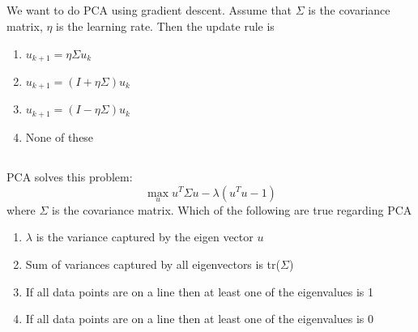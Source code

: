 \begin{frame}
\section{}
  We want to do PCA using gradient descent.
  Assume that $\Sigma$ is the covariance matrix, $\eta$ is the learning rate. Then the update rule is
    \begin{enumerate}[label=(\Alph*)]
      \item $u_{k+1} = \eta\Sigma u_k$
     \item $u_{k+1} = (I+\eta\Sigma)u_k$    %
     \item $u_{k+1} = (I-\eta\Sigma)u_k$
     \item None of these    %
    \end{enumerate}
\end{frame}

\begin{frame}
\section{}
  PCA solves this problem:
  \[\max_u u^T \Sigma u - \lambda (u^Tu-1)\]
  where $\Sigma$ is the covariance matrix.
  Which of the following are true regarding PCA
     \begin{enumerate}[label=(\Alph*)]
       \item $\lambda$ is the variance captured by the eigen vector $u$   %
      \item Sum of variances captured by all eigenvectors is tr($\Sigma$)   %
      \item If all data points are on a line then at least one of the eigenvalues is 1
      \item If all data points are on a line then at least one of the eigenvalues is 0    %
     \end{enumerate}
\end{frame}
